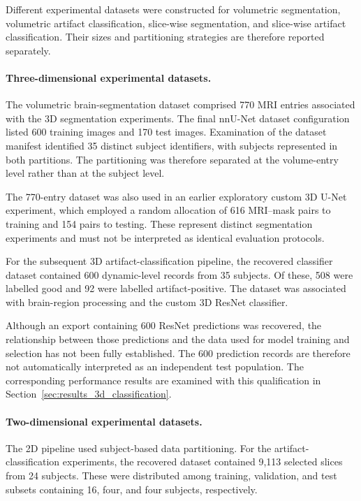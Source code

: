 Different experimental datasets were constructed for volumetric segmentation, volumetric artifact classification, slice-wise segmentation, and slice-wise artifact classification. Their sizes and partitioning strategies are therefore reported separately.

\paragraph{Three-dimensional experimental datasets.}
The volumetric brain-segmentation dataset comprised 770 MRI entries associated with the 3D segmentation experiments. The final nnU-Net dataset configuration listed 600 training images and 170 test images. Examination of the dataset manifest identified 35 distinct subject identifiers, with subjects represented in both partitions. The partitioning was therefore separated at the volume-entry level rather than at the subject level.

The 770-entry dataset was also used in an earlier exploratory custom 3D U-Net experiment, which employed a random allocation of 616 MRI--mask pairs to training and 154 pairs to testing. These represent distinct segmentation experiments and must not be interpreted as identical evaluation protocols.

For the subsequent 3D artifact-classification pipeline, the recovered classifier dataset contained 600 dynamic-level records from 35 subjects. Of these, 508 were labelled good and 92 were labelled artifact-positive. The dataset was associated with brain-region processing and the custom 3D ResNet classifier.

Although an export containing 600 ResNet predictions was recovered, the relationship between those predictions and the data used for model training and selection has not been fully established. The 600 prediction records are therefore not automatically interpreted as an independent test population. The corresponding performance results are examined with this qualification in Section~\ref{sec:results_3d_classification}.

\paragraph{Two-dimensional experimental datasets.}
The 2D pipeline used subject-based data partitioning. For the artifact-classification experiments, the recovered dataset contained 9,113 selected slices from 24 subjects. These were distributed among training, validation, and test subsets containing 16, four, and four subjects, respectively.

